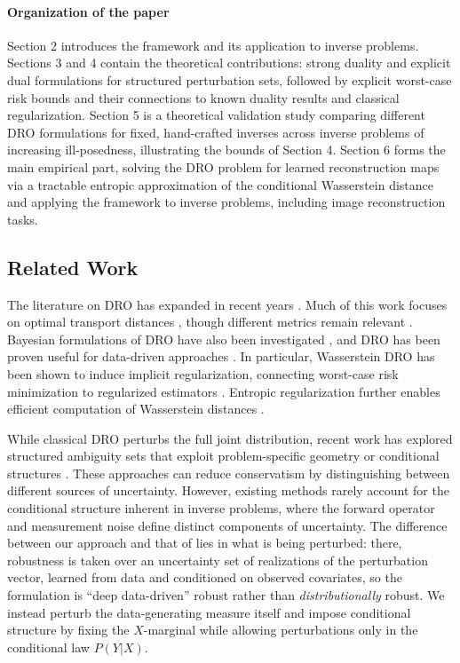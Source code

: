 \documentclass{article}
\theoremstyle{definition}
\theoremstyle{remarksty}
\begin{document}
\paragraph{Organization of the paper}
Section 2 introduces the framework and its application to inverse problems. Sections 3 and 4 contain the theoretical contributions: strong duality and explicit dual formulations for structured perturbation sets, followed by explicit worst-case risk bounds and their connections to known duality results and classical regularization. Section 5 is a theoretical validation study comparing different DRO formulations for fixed, hand-crafted inverses across inverse problems of increasing ill-posedness, illustrating the bounds of Section 4. Section 6 forms the main empirical part, solving the DRO problem for learned reconstruction maps via a tractable entropic approximation of the conditional Wasserstein distance and applying the framework to inverse problems, including image reconstruction tasks.

\subsection{Related Work}
The literature on DRO has expanded in recent years \cite{rahimian_distributionally_2019}. Much of this work focuses on optimal transport distances \cite{blanchet_quantifying_2019, mohajerin_esfahani_data-driven_2018, gao_distributionally_2023}, though different metrics remain relevant \cite{zhu_kernel_2021, hu_kullback-leibler_2012, blanchet_unifying_2025, wang_sinkhorn_2026}. Bayesian formulations of DRO have also been investigated \cite{zhang_distributionally_2025, nguyen_bridging_2023}, and DRO has been proven useful for data-driven approaches \cite{kuhn_wasserstein_2019}. In particular, Wasserstein DRO has been shown to induce implicit regularization, connecting worst-case risk minimization to regularized estimators \cite{shafieezadeh-abadeh_regularization_2019, blanchet_robust_2019, blanchet_distributionally_2025, li_tikhonov_2022}. Entropic regularization further enables efficient computation of Wasserstein distances \cite{cuturi_sinkhorn_2013, peyre_computational_2019}. 

While classical DRO perturbs the full joint distribution, recent work has explored structured ambiguity sets that exploit problem-specific geometry \cite{liu_need_2023} or conditional structures \cite{chenreddy_data-driven_2022}. These approaches can reduce conservatism by distinguishing between different sources of uncertainty. However, existing methods rarely account for the conditional structure inherent in inverse problems, where the forward operator and measurement noise define distinct components of uncertainty. The difference between our approach and that of \cite{chenreddy_data-driven_2022} lies in what is being perturbed: there, robustness is taken over an uncertainty set of realizations of the perturbation vector, learned from data and conditioned on observed covariates, so the formulation is ``deep data-driven'' robust rather than \emph{distributionally} robust. We instead perturb the data-generating measure itself and impose conditional structure by fixing the $X$-marginal while allowing perturbations only in the conditional law $P(Y|X)$.
\end{document}
